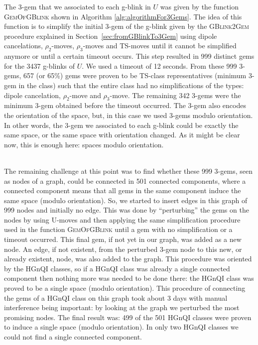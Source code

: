 The 3-gem that we associated to each g-blink in $U$ was given by
the function \textsc{GemOfGBlink} shown in Algorithm \ref{alg:algorithmFor3Gems}.
The idea of this function is to simplify the initial 3-gem of
the g-blink given by the \textsc{GBlink2Gem} procedure explained in
Section~\ref{sec:fromGBlinkTo3Gem} using dipole cancelations,
$\rho_2$-moves, $\rho_3$-moves and TS-moves until it cannot be simplified
anymore or until a certain timeout occurs. This step resulted in 999
distinct gems for the 3437 g-blinks of $U$. We used a timeout of 12 seconds.
From these 999 3-gems, 657 (or 65\%) gems were proven to be
TS-class representatives (minimum 3-gem in the class) such that the entire class
had no simplifications of the types: dipole cancelation, $\rho_2$-move and $\rho_3$-move.
The remaining 342 3-gems were the minimum 3-gem obtained before the timeout
occurred. The 3-gem also encodes the orientation of the space, but, in
this case we used 3-gems modulo orientation. In other words, the 3-gem we
associated to each g-blink could be exactly the same space, or the same
space with orientation changed. As it might be clear now, this is enough
here: spaces modulo orientation.

\\

The remaining challenge at this point was to find whether these 999
3-gems, seen as nodes of a graph, could be connected in 501
connected components, where a connected component means that all
gems in the same component induce the same space (modulo
orientation). So, we started to insert edges in this graph of 999
nodes and initially no edge. This was done by ``perturbing'' the
gems on the nodes by using U-moves and then applying the same
simplification procedure used in the function \textsc{GemOfGBlink}
until a gem with no simplification or a timeout occurred. This final
gem, if not yet in our graph, was added as a new node. An edge, if
not existent, from the perturbed 3-gem node to this new, or already
existent, node, was also added to the graph. This procedure was
oriented by the HGnQI classes, so if a HGnQI class was already a
single connected component then nothing more was needed to be done
there: the HGnQI class was proved to be a single space (modulo
orientation). This procedure of connecting the gems of a HGnQI class
on this graph took about 3 days with manual interference being
important: by looking at the graph we perturbed the most promising
nodes. The final result was: 499 of the 501 HGnQI classes were
proven to induce a single space (modulo orientation). In only two
HGnQI classes we could not find a single connected component.

